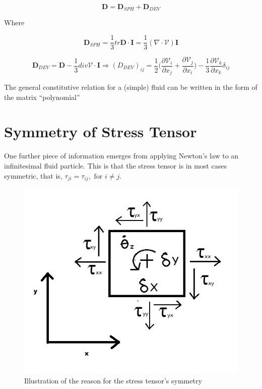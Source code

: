 \documentclass{article}
\begin{document}
{\begin{itemize}
$$\mathbf{D} = \mathbf{D}_{SPH} + \mathbf{D}_{DEV}$$
\end{itemize}


Where 

$$\mathbf{D}_{SPH} = \frac{1}{3}tr\mathbf{D}\cdot\mathbf{I} = \frac{1}{3}(\nabla\cdot \mathcal{V})\mathbf{I}$$

$$\mathbf{D}_{DEV} = \mathbf{D}-\frac{1}{3} div \mathcal{V}\cdot \mathbf{I}\Rightarrow (D_{DEV})_{ij} = \frac{1}{2}\bigg(\frac{\partial \mathcal{V}_{i}}{\partial x_{j}} + \frac{\partial \mathcal{V}_{j}}{\partial x_{i}}\bigg)-\frac{1}{3}\frac{\partial \mathcal{V}_{k}}{\partial x_{k}}\delta_{ij}$$

The general constitutive relation for a (simple) fluid can be written in the form of the matrix
“polynomial”

\section*{Symmetry of Stress Tensor}

One further piece of information emerges from applying Newton's law to an infinitesimal fluid particle. This is that the stress tensor is in most cases symmetric, that is, $\tau_{ji} = \tau_{ij}, \text{ for } i\neq j$.

\begin{figure}[h!]
\centering
\includegraphics[scale=.8]{Illustration of the reason for the stress tensor's symmetry.jpg}
\caption{Illustration of the reason for the stress tensor's symmetry}
\label{fig:Illus_rsn_strss_tensr_symm}
\end{figure}


}
\end{document}
